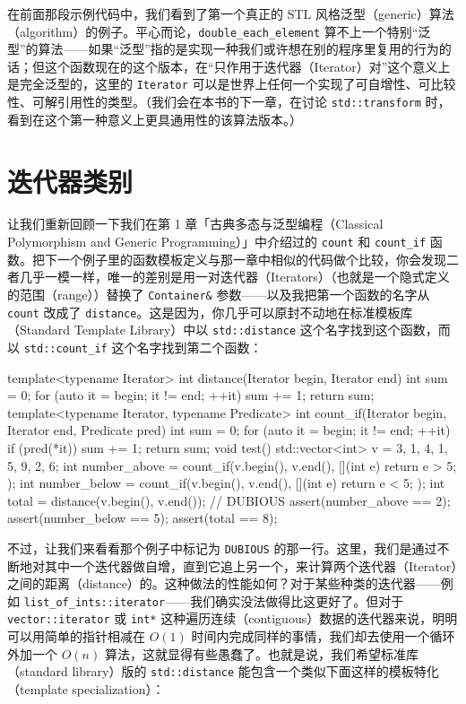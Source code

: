 在前面那段示例代码中，我们看到了第一个真正的 STL 风格泛型（generic）算法（algorithm）的例子。平心而论，\texttt{double\_\allowbreak{}each\_\allowbreak{}element} 算不上一个特别“泛型”的算法——如果“泛型”指的是实现一种我们或许想在别的程序里复用的行为的话；但这个函数现在的这个版本，在“只作用于迭代器（Iterator）对”这个意义上是完全泛型的，这里的 \texttt{Iterator} 可以是世界上任何一个实现了可自增性、可比较性、可解引用性的类型。（我们会在本书的下一章，在讨论 \texttt{std::\allowbreak{}transform} 时，看到在这个第一种意义上更具通用性的该算法版本。）

\section{迭代器类别}

让我们重新回顾一下我们在第 1 章「古典多态与泛型编程（Classical Polymorphism and Generic Programming）」中介绍过的 \texttt{count} 和 \texttt{count\_\allowbreak{}if} 函数。把下一个例子里的函数模板定义与那一章中相似的代码做个比较，你会发现二者几乎一模一样，唯一的差别是用一对迭代器（Iterators）（也就是一个隐式定义的范围（range））替换了 \texttt{Container\&} 参数——以及我把第一个函数的名字从 \texttt{count} 改成了 \texttt{distance}。这是因为，你几乎可以原封不动地在标准模板库（Standard Template Library）中以 \texttt{std::\allowbreak{}distance} 这个名字找到这个函数，而以 \texttt{std::\allowbreak{}count\_\allowbreak{}if} 这个名字找到第二个函数：

\begin{codebox}[cpp]
    template<typename Iterator>
    int distance(Iterator begin, Iterator end)
    {
      int sum = 0;
      for (auto it = begin; it != end; ++it) {
        sum += 1;
      }
      return sum;
    }
    template<typename Iterator, typename Predicate>
    int count_if(Iterator begin, Iterator end, Predicate pred)
    {
      int sum = 0;
      for (auto it = begin; it != end; ++it) {
        if (pred(*it)) {
            sum += 1;
        }
      }
      return sum;
    }
    void test()
    {
      std::vector<int> v = {3, 1, 4, 1, 5, 9, 2, 6};
      int number_above = count_if(v.begin(), v.end(), [](int e) { return e
> 5; });
      int number_below = count_if(v.begin(), v.end(), [](int e) { return e
< 5; });
      int total = distance(v.begin(), v.end()); // DUBIOUS
      assert(number_above == 2);
      assert(number_below == 5);
      assert(total == 8);
    }
\end{codebox}

不过，让我们来看看那个例子中标记为 \texttt{DUBIOUS} 的那一行。这里，我们是通过不断地对其中一个迭代器做自增，直到它追上另一个，来计算两个迭代器（Iterator）之间的距离（distance）的。这种做法的性能如何？对于某些种类的迭代器——例如 \texttt{list\_\allowbreak{}of\_\allowbreak{}ints::\allowbreak{}iterator}——我们确实没法做得比这更好了。但对于 \texttt{vector::\allowbreak{}iterator} 或 \texttt{int*} 这种遍历连续（contiguous）数据的迭代器来说，明明可以用简单的指针相减在 $O(1)$ 时间内完成同样的事情，我们却去使用一个循环外加一个 $O(n)$ 算法，这就显得有些愚蠢了。也就是说，我们希望标准库（standard library）版的 \texttt{std::\allowbreak{}distance} 能包含一个类似下面这样的模板特化（template specialization）：

